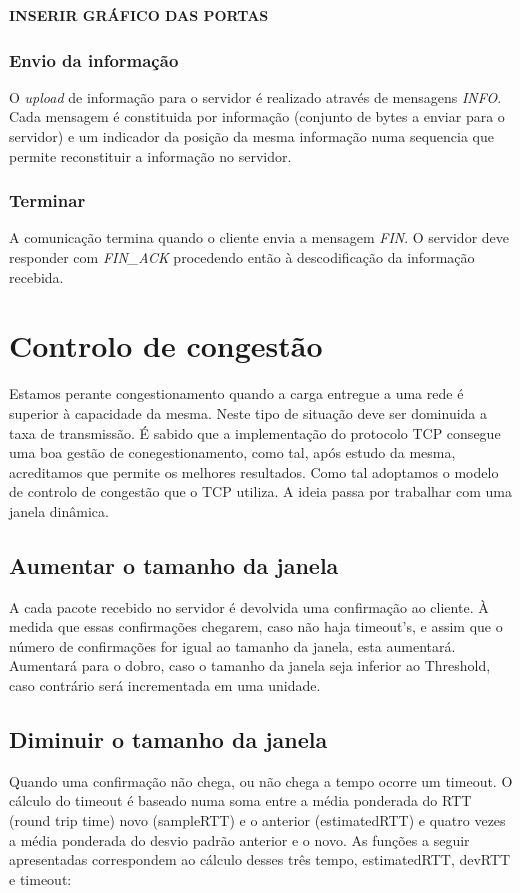 \documentclass{llncs}
\begin{document}
\textbf{INSERIR GRÁFICO DAS PORTAS}


\subsubsection{Envio da informação}
O \textit{upload} de informação para o servidor é realizado através de mensagens \textit{INFO}. Cada mensagem é constituida por informação (conjunto de bytes a enviar para o servidor) e um indicador da posição da mesma informação numa sequencia que permite reconstituir a informação no servidor.

\subsubsection{Terminar}
A comunicação termina quando o cliente envia a mensagem \textit{FIN}. O servidor deve responder com \textit{FIN\_ACK} procedendo então à descodificação da informação recebida.


\section{Controlo de congestão}
Estamos perante congestionamento quando a carga entregue a uma rede é superior à capacidade da mesma. Neste tipo de situação deve ser dominuida a taxa de transmissão.
É sabido que a implementação do protocolo TCP consegue uma boa gestão de conegestionamento, como tal, após estudo da mesma, acreditamos que permite os melhores resultados. Como tal adoptamos o modelo de controlo de congestão que o TCP utiliza. A ideia passa por trabalhar com uma janela dinâmica.

\subsection{Aumentar o tamanho da janela}

A cada pacote recebido no servidor é devolvida uma confirmação ao cliente. À medida que essas confirmações chegarem, caso não haja timeout’s, e assim que o número de confirmações for igual ao tamanho da janela, esta aumentará.
Aumentará para o dobro, caso o tamanho da janela seja inferior ao Threshold, caso contrário será incrementada em uma unidade.

\subsection{Diminuir o tamanho da janela}

Quando uma confirmação não chega, ou não chega a tempo ocorre um timeout. 
O cálculo do timeout é baseado numa soma entre a média ponderada do RTT (round trip time) novo (sampleRTT) e o anterior (estimatedRTT) e quatro vezes a média ponderada do desvio padrão anterior e o novo.
As funções a seguir apresentadas correspondem ao cálculo desses três tempo, estimatedRTT, devRTT e timeout:
\end{document}
